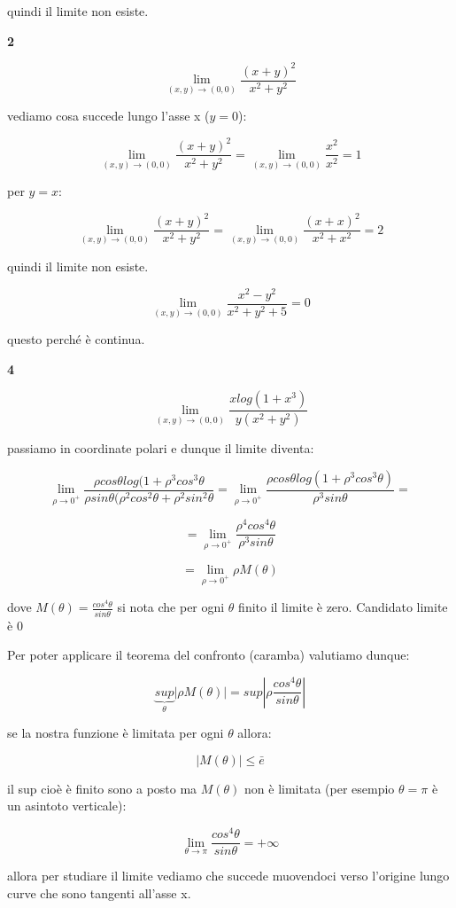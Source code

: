 \documentclass[11pt]{article}
\begin{document}
quindi il limite non esiste.

\textbf{2} 

\[
    \lim_{ (x,y) \to (0,0) } \frac{(x+y)^{2}}{x^{2}+y^{2}}
\]

vediamo cosa succede lungo l'asse x ($y=0$):

\[
    \lim_{ (x,y) \to (0,0) } \frac{(x+y)^{2}}{x^{2}+y^{2}} = \lim_{ (x,y) \to (0,0) } \frac{x^{2}}{x^{2}} = 1
\]

per $y=x$:

\[
    \lim_{ (x,y) \to (0,0) } \frac{(x+y)^{2}}{x^{2}+y^{2}} = \lim_{ (x,y) \to (0,0) } \frac{(x+x)^{2}}{x^{2}+x^{2}} = 2
\]

quindi il limite non esiste.

\[
    \lim_{ (x,y) \to (0,0) } \frac{x^{2}-y^{2}}{x^{2}+y^{2}+5} = 0
\]

questo perché è continua.

\textbf{4} 

\[
    \lim_{ (x,y) \to (0,0) } \frac{xlog(1+x^{3})}{y(x^{2}+y^{2})}
\]


passiamo in coordinate polari e dunque il limite diventa:

\[
    \lim_{ \rho \to 0^{+} } \frac{\rho cos \theta log(1+\rho^{3}cos^{3}\theta}{\rho sin\theta (\rho ^{2} cos^{2} \theta + \rho^{2}sin^{2}\theta}=\lim_{ \rho \to 0^{+} } \frac{\rho cos \theta log(1+\rho^{3}cos^{3}\theta)}{\rho^{3}sin\theta}  =
\]

\[
    =\lim_{ \rho \to 0^{+} } \frac{\rho^{4}cos^{4}\theta}{\rho^{3}sin \theta}
\]

\[
    = \lim_{ \rho \to 0^{+} } \rho M(\theta)
\]

dove $M(\theta)= \frac{cos^{4}\theta}{sin\theta}$ si nota che per ogni $\theta$ finito il limite è zero. Candidato limite è 0

Per poter applicare il teorema del confronto (caramba) valutiamo dunque:

\[
    \underbrace{sup}_{\theta} | \rho M(\theta)| = sup |\rho \frac{cos^{4}\theta}{sin\theta}|
\]

se la nostra funzione è limitata per ogni $\theta$ allora:

\[
    |M(\theta)| \le \bar{e} 
\]

il sup cioè è finito sono a posto ma $M(\theta)$ non è limitata (per esempio $\theta= \pi$ è un asintoto verticale):

\[
    \lim_{ \theta \to \pi } \frac{cos^{4}\theta}{sin\theta}= +\infty
\]

allora per studiare il limite vediamo che succede muovendoci verso l'origine lungo curve che sono tangenti all'asse x.
\end{document}
